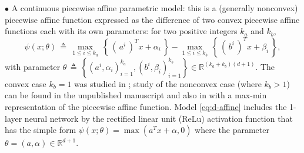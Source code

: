 \documentclass{siamart}
\begin{document}
$\bullet $ A continuous piecewise affine parametric model: this is a (generally nonconvex) piecewise affine function expressed as
the difference of two convex piecewise affine functions \cite{Scholtes02} each with its own parameters: for two positive integers $k_a$ and $k_b$,
\begin{equation}\label{eq:d-affine}
\psi(x;\theta) \, \triangleq \, \displaystyle{
\max_{1 \leq i \leq k_a}
} \, \left\{ \, ( \, a^i \, )^T x + \alpha_i \, \right\} - \displaystyle{
\max_{1 \leq i \leq k_b}
} \, \left\{ \, ( \, b^i \, )^T x + \beta_i \, \right\},
\end{equation}
with parameter $\theta \,\triangleq \,\left\{ \left( a^i, \alpha_i \right)_{i=1}^{k_a}, \left( b^i, \beta_i \right)_{i=1}^{k_b} \right\}
\in \mathbb{R}^{(k_a + k_b)(d + 1)}$.
The convex case $k_b = 1$ was studied in \cite{HannahDunson11,HannahDunson13,MCISen15}; study of the nonconvex case (where $k_b > 1$)
can be found in the unpublished manuscript \cite{HahnBanergjeeSen16} and also in \cite{Bagirov10} with a max-min representation of the piecewise affine function. Model \eqref{eq:d-affine} includes the 1-layer neural network
by the rectified linear unit (ReLu) activation function \cite{NairHinton2010, GlorotBordesBengio2011} that has the simple
form $\psi(x;\theta) = \max(a^T x + \alpha, 0)$ where the parameter $\theta = (a, \alpha) \in \mathbb{R}^{d+1}$.
\end{document}
